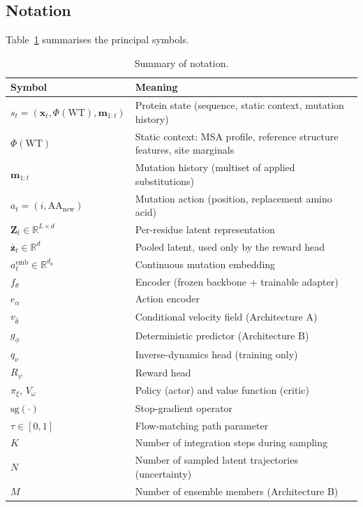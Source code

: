 \documentclass[12pt, a4paper]{article}
\begin{document}
\subsection{Notation}

Table~\ref{tab:notation} summarises the principal symbols.

\begin{table}[h]
\centering
\caption{Summary of notation.}
\label{tab:notation}
\small
\begin{tabular}{ll}
\toprule
\textbf{Symbol} & \textbf{Meaning} \\
\midrule
$s_t = (\mathbf{x}_t, \Phi(\mathrm{WT}), \mathbf{m}_{1:t})$ & Protein state (sequence, static context, mutation history) \\
$\Phi(\mathrm{WT})$ & Static context: MSA profile, reference structure features, site marginals \\
$\mathbf{m}_{1:t}$ & Mutation history (multiset of applied substitutions) \\
$a_t = (i, \mathrm{AA}_\text{new})$ & Mutation action (position, replacement amino acid) \\
$\mathbf{Z}_t \in \mathbb{R}^{L \times d}$ & Per-residue latent representation \\
$\bar{\mathbf{z}}_t \in \mathbb{R}^{d}$ & Pooled latent, used only by the reward head \\
$a_t^\text{emb} \in \mathbb{R}^{d_a}$ & Continuous mutation embedding \\
$f_\theta$ & Encoder (frozen backbone + trainable adapter) \\
$e_\alpha$ & Action encoder \\
$v_{\hat{\theta}}$ & Conditional velocity field (Architecture A) \\
$g_\phi$ & Deterministic predictor (Architecture B) \\
$q_\nu$ & Inverse-dynamics head (training only) \\
$R_\psi$ & Reward head \\
$\pi_\xi$, $V_\omega$ & Policy (actor) and value function (critic) \\
$\mathrm{sg}(\cdot)$ & Stop-gradient operator \\
$\tau \in [0,1]$ & Flow-matching path parameter \\
$K$ & Number of integration steps during sampling \\
$N$ & Number of sampled latent trajectories (uncertainty) \\
$M$ & Number of ensemble members (Architecture B) \\

\end{tabular}
\end{table}
\end{document}
